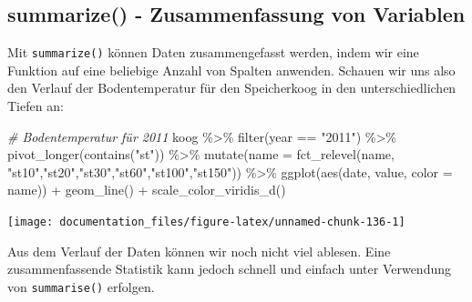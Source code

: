 \documentclass[
]{article}
\newenvironment{Shaded}{\begin{snugshade}}{\end{snugshade}}
\newcommand{\AttributeTok}[1]{\textcolor[rgb]{0.77,0.63,0.00}{#1}}
\newcommand{\CommentTok}[1]{\textcolor[rgb]{0.56,0.35,0.01}{\textit{#1}}}
\newcommand{\FunctionTok}[1]{\textcolor[rgb]{0.00,0.00,0.00}{#1}}
\newcommand{\NormalTok}[1]{#1}
\newcommand{\SpecialCharTok}[1]{\textcolor[rgb]{0.00,0.00,0.00}{#1}}
\newcommand{\StringTok}[1]{\textcolor[rgb]{0.31,0.60,0.02}{#1}}
\begin{document}
\hypertarget{summarize---zusammenfassung-von-variablen}{%
\subsection{summarize() - Zusammenfassung von Variablen}\label{summarize---zusammenfassung-von-variablen}}

Mit \texttt{summarize()} können Daten zusammengefasst werden, indem wir eine Funktion auf eine beliebige Anzahl von Spalten anwenden. Schauen wir uns also den Verlauf der Bodentemperatur für den Speicherkoog in den unterschiedlichen Tiefen an:

\begin{Shaded}
\begin{Highlighting}[]
\CommentTok{\# Bodentemperatur für 2011}
\NormalTok{koog }\SpecialCharTok{\%\textgreater{}\%}
  \FunctionTok{filter}\NormalTok{(year }\SpecialCharTok{==} \StringTok{"2011"}\NormalTok{) }\SpecialCharTok{\%\textgreater{}\%}
  \FunctionTok{pivot\_longer}\NormalTok{(}\FunctionTok{contains}\NormalTok{(}\StringTok{"st"}\NormalTok{)) }\SpecialCharTok{\%\textgreater{}\%}
  \FunctionTok{mutate}\NormalTok{(}\AttributeTok{name =} \FunctionTok{fct\_relevel}\NormalTok{(name, }\StringTok{"st10"}\NormalTok{,}\StringTok{"st20"}\NormalTok{,}\StringTok{"st30"}\NormalTok{,}\StringTok{"st60"}\NormalTok{,}\StringTok{"st100"}\NormalTok{,}\StringTok{"st150"}\NormalTok{)) }\SpecialCharTok{\%\textgreater{}\%}
  \FunctionTok{ggplot}\NormalTok{(}\FunctionTok{aes}\NormalTok{(date, value, }\AttributeTok{color =}\NormalTok{ name)) }\SpecialCharTok{+}
  \FunctionTok{geom\_line}\NormalTok{() }\SpecialCharTok{+}
  \FunctionTok{scale\_color\_viridis\_d}\NormalTok{()}
\end{Highlighting}
\end{Shaded}

\begin{center}\texttt{[image: documentation\_files/figure-latex/unnamed-chunk-136-1]} \end{center}

Aus dem Verlauf der Daten können wir noch nicht viel ablesen. Eine zusammenfassende Statistik kann jedoch schnell und einfach unter Verwendung von \texttt{summarise()} erfolgen.
\end{document}
